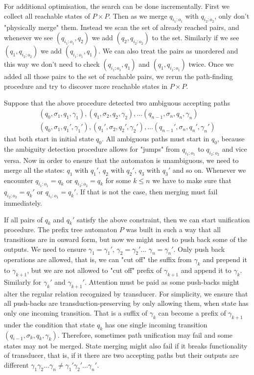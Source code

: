 For additional optimisation, the search can be done incrementally. First we collect all reachable states of $P \times P$. Then as we merge $q_{i_1:o_1}$ with $q_{i_2:o_2}$, only don't "physically merge" them. Instead we scan the set of already reached pairs, and whenever we see $(q_{i_1:o_1},q_2)$ we add $(q_2,q_{i_2:o_2})$ to the set. Similarly if we see $(q_1,q_{i_2:o_2})$ we add $(q_{i_1:o_1},q_1)$. We can also treat the pairs as unordered and this way we don't need to check  $(q_{i_1:o_1},q_1)$ and  $(q_1,q_{i_1:o_1})$ twice. Once we added all those pairs to the set of reachable pairs, we rerun the path-finding procedure and try to discover more reachable states in $P \times P$. 


Suppose that the above procedure detected two ambiguous accepting paths 
\begin{equation*}
\begin{split}
(q_0,\sigma_1,q_1,\gamma_1),(q_1,\sigma_2,q_2,\gamma_2),
...(q_{n-1},\sigma_n,q_n,\gamma_n) \\
(q_0,\sigma_1,q_1',\gamma_1'), (q_1',\sigma_2,q_2',\gamma_2'),... (q_{n-1}',\sigma_n,q_n',\gamma_n')
\end{split}
\end{equation*}
that both start in initial state $q_0$. All ambiguous paths must start in $q_0$, because the ambiguity detection procedure allows for "jumps" from $q_{i_1:o_1}$ to $q_{i_2:o_2}$ and vice versa. 
Now in order to ensure that the automaton is unambiguous, we need to merge all the states: $q_1$ with $q_1'$, $q_2$ with $q_2'$, $q_3$ with $q_3'$ and so on. Whenever we encounter $q_{i_1:o_1}=q_k$ or $q_{i_2:o_2}=q_k$ for some $k\le n$ we have to make sure that $q_{i_2:o_2}=q_k'$ or $q_{i_1:o_1}=q_k'$. If that is not the case, then merging must fail immediately. 


If all pairs of $q_k$ and $q_k'$ satisfy the above constraint, then we can start unification procedure. The prefix tree automaton $P$ was built in such a way that all transitions are in onward form, but now we might need to push back some of the outputs. We need to ensure $\gamma_1=\gamma_1'$, $\gamma_2=\gamma_2'$... $\gamma_n=\gamma_n'$. Only push back operations are allowed, that is, we can "cut off" the suffix from $\gamma_k$ and  prepend it to $\gamma_{k+1}$, but we are not allowed to "cut off" prefix of $\gamma_{k+1}$ and append it to $\gamma_k$. Similarly for $\gamma_k'$ and $\gamma_{k+1}' $. Attention must be paid as some push-backs might alter the regular relation recognized by transducer. For simplicity, we ensure that all push-backs are transduction-preserving  by only allowing them, when state has only one incoming transition. That is a suffix of $\gamma_k$ can become a prefix of $\gamma_{k+1}$ under the condition that state $q_k$ has one single incoming transition $(q_{i-1},\sigma_k,q_k,\gamma_k)$. Therefore, sometimes path unification may fail and some states may not be merged.
State merging might also fail if it breaks functionality of transducer, that is, if it there are two accepting paths but their outputs are different $\gamma_1\gamma_2...\gamma_n\ne\gamma_1'\gamma_2'...\gamma_n'$. 



